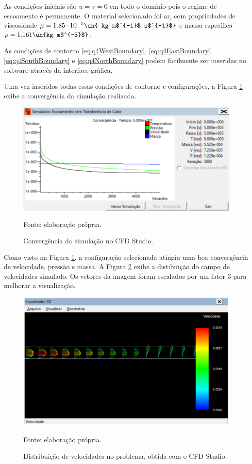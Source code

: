 As condições iniciais são $u = v = 0$ em todo o domínio pois o regime de escoamento é permanente.
O material selecionado foi ar, com propriedades de viscosidade $\mu=1.85 \cdot 10^{-5} \un{ kg m$^{-1}$ s$^{-1}$}$ e
massa específica $\rho=1.161 \un{kg m$^{-3}$}$.

As condições de contorno \eqref{eq:q4WestBoundary}, \eqref{eq:q4EastBoundary}, 
\eqref{eq:q4SouthBoundary} e \eqref{eq:q4NorthBoundary} podem facilmente ser inseridas 
no software através da interface gráfica. 

Uma vez inseridos todas essas condições de contorno e configurações, a Figura \ref*{fig:convergencia}
exibe a convergência da simulação realizada.

\begin{figure}[h!]
    \caption{Convergência da simulação no CFD Studio.}
    \label{fig:convergencia}
    \centering
    \centerline{\includegraphics[scale=0.45]{convergencia.png}}
    \par{Fonte: elaboração própria.}
\end{figure}

Como visto na Figura \ref*{fig:convergencia}, a configuração selecionada atingiu uma boa  
convergência de velocidade, pressão e massa. A Figura \ref*{fig:velocidades} exibe a 
distibuição do campo de velocidades simulado. Os vetores da imagem foram escalados por um fator
3 para melhorar a visualização.

\begin{figure}[h!]
    \caption{Distribuição de velocidades no problema, obtida com o CFD Studio.}
    \label{fig:velocidades}
    \centering
    \centerline{\includegraphics[scale=0.45]{velocidades.png}}
    \par{Fonte: elaboração própria.}
\end{figure}

